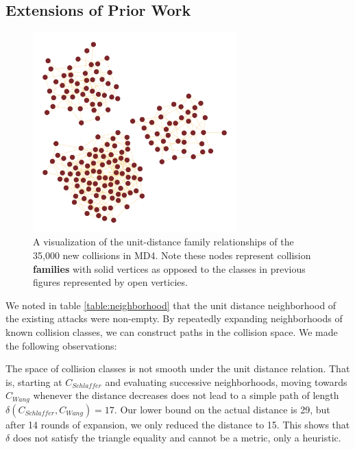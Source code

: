 \documentclass[conference]{IEEEtran}
\begin{document}
\subsection{Extensions of Prior Work}

\begin{figure}
\begin{center}
\includegraphics[width=0.7\textwidth]{Figs/families48.pdf}
\caption{A visualization of the unit-distance family relationships
of the 35,000 new collisions in MD4. Note these nodes represent
collision \textbf{families} with solid vertices as opposed to the
classes in previous figures represented by open verticies.}
\label{Fig:Families48}
\end{center}
\end{figure}

We noted in table \ref{table:neighborhood} that the unit distance neighborhood of
the existing attacks were non-empty. By repeatedly expanding neighborhoods of
known collision classes, we can construct paths in the collision space. We
made the following observations:

The space of collision classes is not smooth under the unit distance
relation. That is, starting at $C_{Schlaffer}$ and evaluating
successive neighborhoods, moving towards $C_{Wang}$ whenever the
distance decreases does not lead to a simple path of length
$\delta(C_{Schlaffer}, C_{Wang}) = 17$. Our lower bound on the actual
distance is 29, but after 14 rounds of expansion, we only reduced the
distance to 15. This shows that $\delta$ does not satisfy the triangle
equality and cannot be a metric, only a heuristic.
\end{document}
